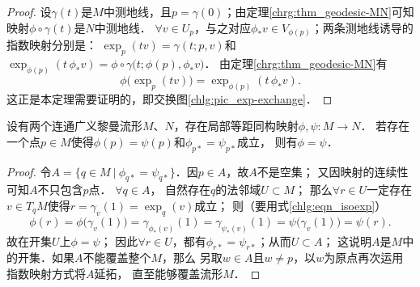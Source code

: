 \begin{proof}
    设$\gamma(t)$是$M$中测地线，且$p=\gamma(0)$；由定理\ref{chrg:thm_geodesic-MN}可知
    映射$\phi\circ\gamma(t)$是$N$中测地线．
    $\forall v\in U_p$，与之对应$\phi_* v \in V_{\phi(p)}$；两条测地线诱导的指数映射分别是：
    $\exp_p(t v)=\gamma(t;p,v)$和
    $\exp_{\phi(p)}(t\, \phi_*v)=\phi\circ\gamma\bigl(t;\phi(p),\phi_* v\bigr)$．
    由定理\ref{chrg:thm_geodesic-MN}有
    \begin{equation}\label{chlg:eqn_isoexp}
        \phi \bigl(\exp_p(t v)\bigr) = \exp_{\phi(p)}(t\, \phi_* v ) .
    \end{equation}
    这正是本定理需要证明的，即交换图\ref{chlg:pic_exp-exchange}．
\end{proof}

\begin{proposition}\label{chlg:thm_isopall}
    设有两个连通广义黎曼流形$M$、$N$，存在局部等距同构映射$\phi,\psi:M\to N$．
    若存在一个点$p\in M$使得$\phi(p)=\psi(p)$和$\phi_{p*} = \psi_{p*}$成立，
    则有$\phi=\psi$．
\end{proposition}
\begin{proof}
    令$A=\{ q\in M \ | \  \phi_{q*} = \psi_{q*}\}$．因$p\in A$，故$A$不是空集；
    又因映射的连续性可知$A$不只包含$p$点．    $\forall q\in A$，
    自然存在$q$的法邻域$U\subset M$；
    那么$\forall r\in U$一定存在$v\in T_q M$使得$r=\gamma_v(1)=\exp_q(v)$成立；
    则（要用式\eqref{chlg:eqn_isoexp}）
    \begin{equation}
        \phi(r) = \phi \bigl(\gamma_v(1)\bigr)= \gamma_{\phi_*(v)} (1)
        = \gamma_{\psi_*(v)} (1) =\psi \bigl(\gamma_v(1)\bigr) =\psi(r).
    \end{equation}
    故在开集$U$上$\phi=\psi$；
    因此$\forall r\in U$，都有$\phi_{r*} = \psi_{r*}$；从而$U\subset A$；
    这说明$A$是$M$中的开集．如果$A$不能覆盖整个$M$，那么
    另取$w\in A$且$w\neq p$，以$w$为原点再次运用指数映射方式将$A$延拓，
    直至能够覆盖流形$M$．
\end{proof}

